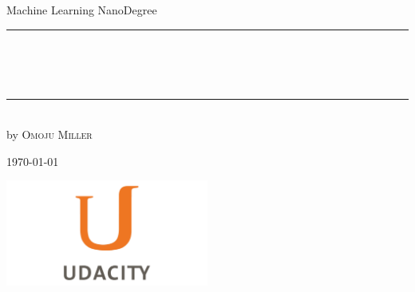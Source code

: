 
\begin{titlepage}
    \begin{addmargin}[-1cm]{-3cm}
    \begin{center}
        \large
       

        \vfill

        Machine Learning NanoDegree\\ \vskip1cm
        \rule{14cm}{0.4pt}\\ \bigskip
        \begingroup
            \Large
            \color{Maroon}\spacedallcaps{\myTitle} \\ \bigskip
        \endgroup
        \spacedlowsmallcaps{\mySubtitle} \\ \bigskip
        \rule{14cm}{0.4pt}\\ \vskip1cm
        by \textsc{Omoju Miller}

        \vfill
        \vfill
        \vfill

       
        \hfill \today
    \end{center}
    \vspace{-3.5cm}
    \includegraphics[width=0.50\textwidth]{figures/udacity_logo}
  \end{addmargin}
\end{titlepage}
